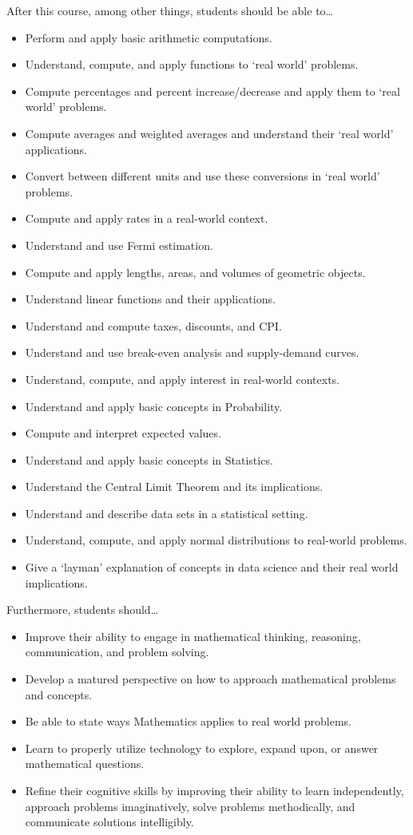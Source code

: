 \documentclass[11pt,letterpaper]{article}
\begin{document}
After this course, among other things, students should be able to\dots
	\begin{itemize} \itemsep=0.2ex
	\item Perform and apply basic arithmetic computations.
	\item Understand, compute, and apply functions to `real world' problems. 
	\item Compute percentages and percent increase/decrease and apply them to `real world' problems.
	\item Compute averages and weighted averages and understand their `real world' applications. 
	\item Convert between different units and use these conversions in `real world' problems. 
	\item Compute and apply rates in a real-world context. 
	\item Understand and use Fermi estimation. 
	\item Compute and apply lengths, areas, and volumes of geometric objects. 
	\item Understand linear functions and their applications.
	\item Understand and compute taxes, discounts, and CPI.
	\item Understand and use break-even analysis and supply-demand curves. 
	\item Understand, compute, and apply interest in real-world contexts. 
	\item Understand and apply basic concepts in Probability. 
	\item Compute and interpret expected values. 
	\item Understand and apply basic concepts in Statistics. 
	\item Understand the Central Limit Theorem and its implications. 
	\item Understand and describe data sets in a statistical setting. 
	\item Understand, compute, and apply normal distributions to real-world problems.
	\item Give a `layman' explanation of concepts in data science and their real world implications. 
	\end{itemize}
Furthermore, students should\dots
	\begin{itemize} \itemsep=0.3ex
	\item  Improve their ability to engage in mathematical thinking, reasoning, communication, and problem solving.
	\item Develop a matured perspective on how to approach mathematical problems and concepts.
	\item Be able to state ways Mathematics applies to real world problems.
	\item Learn to properly utilize technology to explore, expand upon, or answer mathematical questions.
	\item Refine their cognitive skills by improving their ability to learn independently, approach problems imaginatively, solve problems methodically, and communicate solutions intelligibly.
	\end{itemize}
\sectionbreak
\end{document}
